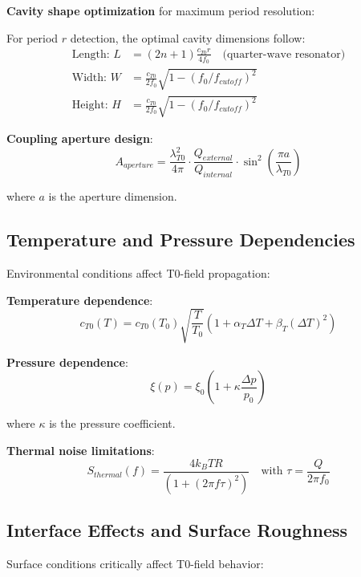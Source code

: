 \documentclass[12pt,a4paper]{article}
\begin{document}
	\textbf{Cavity shape optimization} for maximum period resolution:
	
	For period $r$ detection, the optimal cavity dimensions follow:
	\begin{align}
		\text{Length: } L &= (2n+1) \frac{c_{T0} r}{4 f_0} \quad \text{(quarter-wave resonator)} \\
		\text{Width: } W &= \frac{c_{T0}}{2 f_0} \sqrt{1 - (f_0/f_{cutoff})^2} \\
		\text{Height: } H &= \frac{c_{T0}}{2 f_0} \sqrt{1 - (f_0/f_{cutoff})^2}
	\end{align}
	
	\textbf{Coupling aperture design}:
	\begin{equation}
		A_{aperture} = \frac{\lambda_{T0}^2}{4\pi} \cdot \frac{Q_{external}}{Q_{internal}} \cdot \sin^2\left(\frac{\pi a}{\lambda_{T0}}\right)
	\end{equation}
	
	where $a$ is the aperture dimension.
	
	\subsection{Temperature and Pressure Dependencies}
	
	Environmental conditions affect T0-field propagation:
	
	\textbf{Temperature dependence}:
	\begin{equation}
		c_{T0}(T) = c_{T0}(T_0) \sqrt{\frac{T}{T_0}} \left(1 + \alpha_T \Delta T + \beta_T (\Delta T)^2\right)
	\end{equation}
	
	\textbf{Pressure dependence}:
	\begin{equation}
		\xi(p) = \xi_0 \left(1 + \kappa \frac{\Delta p}{p_0}\right)
	\end{equation}
	
	where $\kappa$ is the pressure coefficient.
	
	\textbf{Thermal noise limitations}:
	\begin{equation}
		S_{thermal}(f) = \frac{4 k_B T R}{(1 + (2\pi f \tau)^2)} \quad \text{with } \tau = \frac{Q}{2\pi f_0}
	\end{equation}
	
	\subsection{Interface Effects and Surface Roughness}
	
	Surface conditions critically affect T0-field behavior:
	
\end{document}
